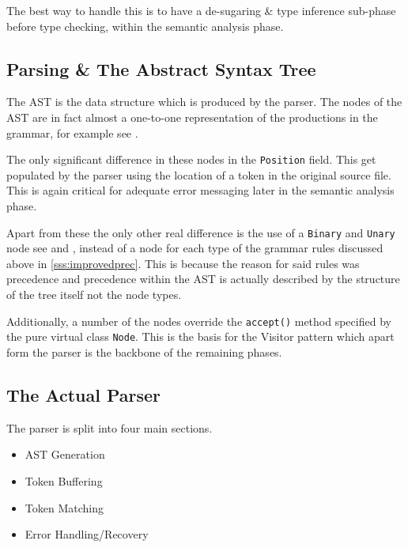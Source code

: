 The best way to handle this is to have a de-sugaring \& type
inference sub-phase before type checking, within the semantic
analysis phase.

\subsection{Parsing \& The Abstract Syntax Tree}

The AST is the data structure which is produced by the parser.
The nodes of the AST are in fact almost a one-to-one
representation of the productions in the grammar, for example
see .



The only significant difference in these nodes in the
\texttt{Position} field. This get populated by the parser using
the location of a token in the original source file. This is
again critical for adequate error messaging later in the
semantic analysis phase.





Apart from these the only other real difference is the use of a
\texttt{Binary} and \texttt{Unary} node see 
and , instead of a node for each type of the
grammar rules discussed above in \ref{sss:improvedprec}. This is
because the reason for said rules was precedence and precedence
within the AST is actually described by the structure of the
tree itself not the node types.

Additionally, a number of the nodes override the
\texttt{accept()} method specified by the pure virtual class
\texttt{Node}. This is the basis for the Visitor pattern which
apart form the parser is the backbone of the remaining phases.

\subsection{The Actual Parser}

The parser is split into four main sections.

\begin{itemize}
    \item AST Generation
    \item Token Buffering
    \item Token Matching
    \item Error Handling/Recovery
\end{itemize}

